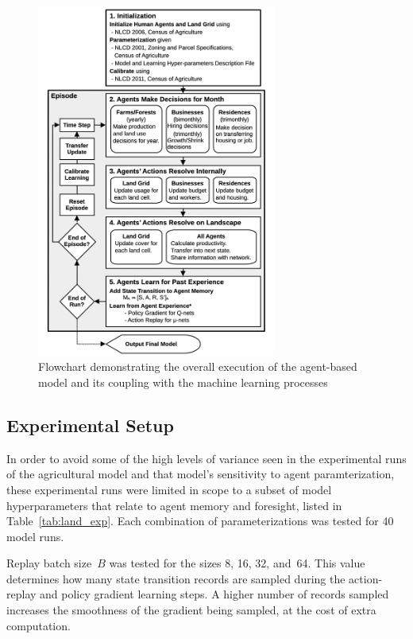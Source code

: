 \begin{figure}
\centering
\includegraphics[width=0.7\textwidth]{figure/flowchart2.png}
\caption{Flowchart demonstrating the overall execution of the agent-based model
    and its coupling with the machine learning processes}
\label{fig:land_exec_2}
\end{figure}


\subsection{Experimental Setup}
\label{subsec:land_exp_setup}

In order to avoid some of the high levels of variance seen
in the experimental runs of the agricultural model and that model's sensitivity
to agent paramterization, these experimental runs were limited in scope
to a subset of model hyperparameters that relate to agent memory
and foresight, listed in Table~\ref{tab:land_exp}.
Each combination of parameterizations was tested for 40 model runs.

Replay batch size~$B$ was tested for the sizes 8, 16, 32, and~64.
This value determines how many state transition records are sampled
during the action-replay and policy gradient learning steps.
A higher number of records sampled increases the smoothness of
the gradient being sampled, at the cost of extra computation.

